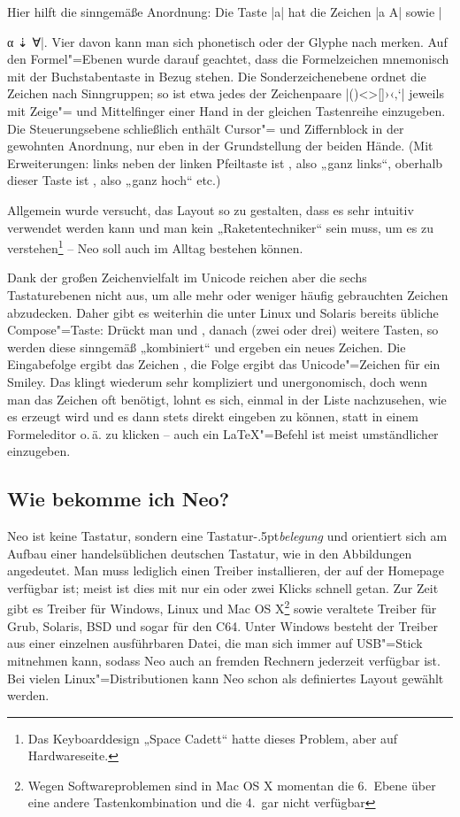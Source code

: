 \documentclass[ngerman]{dtk}
\newcommand{\taste}[1]{\makebox{\textsf{#1}}}
\begin{document}
Hier hilft die sinngemäße Anordnung: Die Taste |a| hat die Zeichen |a A| sowie |{ α ⇣ ∀|. Vier davon kann man sich phonetisch oder der Glyphe nach merken. Auf den Formel"=Ebenen wurde darauf geachtet, dass die Formelzeichen mnemonisch mit der Buchstabentaste in Bezug stehen.  Die Sonderzeichenebene ordnet die Zeichen nach Sinngruppen; so ist etwa jedes der Zeichenpaare |()<>{}[]›‹‚‘| jeweils mit Zeige"= und Mittelfinger einer Hand in der gleichen Tastenreihe einzugeben.  Die Steuerungsebene schließlich enthält Cursor"= und Ziffernblock in der gewohnten Anordnung, nur eben in der Grundstellung der beiden Hände. (Mit Erweiterungen: links neben der linken Pfeiltaste ist \taste{Pos 1}, also „ganz links“, oberhalb dieser Taste ist \taste{Bild hoch}, also „ganz hoch“ etc.)

Allgemein wurde versucht, das Layout so zu gestalten, dass es sehr intuitiv verwendet werden kann und man kein „Raketentechniker“ sein muss, um es zu verstehen\footnote{Das Keyboarddesign „Space Cadett“ hatte dieses Problem, aber auf Hardwareseite.} – Neo soll auch im Alltag bestehen können.

Dank der großen Zeichenvielfalt im Unicode reichen aber die sechs Tastaturebenen nicht aus, um alle mehr oder weniger häufig gebrauchten Zeichen abzudecken. Daher gibt es weiterhin die unter Linux und Solaris bereits übliche Compose"=Taste: Drückt man \taste{Mod 3} und \taste{Tab}, danach (zwei oder drei) weitere Tasten, so werden diese sinngemäß „kombiniert“ und ergeben ein neues Zeichen. Die Eingabefolge \taste{Compose a e} ergibt das Zeichen \taste{æ}, die Folge \taste{Compose : )} ergibt das Unicode"=Zeichen für ein Smiley. Das klingt wiederum sehr kompliziert und unergonomisch, doch wenn man das Zeichen oft benötigt, lohnt es sich, einmal in der Liste nachzusehen, wie es erzeugt wird und es dann stets direkt eingeben zu können, statt in einem Formeleditor o.\,ä. zu klicken – auch ein \LaTeX"=Befehl ist meist umständlicher einzugeben.

\subsection{Wie bekomme ich Neo?}
Neo ist keine Tastatur, sondern eine Tastatur\kern -.5pt\emph{belegung} und orientiert sich am Aufbau einer handelsüblichen deutschen Tastatur, wie in den Abbildungen angedeutet. Man muss lediglich einen Treiber installieren, der auf der Homepage verfügbar ist; meist ist dies mit nur ein oder zwei Klicks schnell getan. Zur Zeit gibt es Treiber für Windows, Linux und Mac OS X\footnote{Wegen Softwareproblemen sind in Mac OS X momentan die 6.~Ebene über eine andere Tastenkombination und die 4.~gar nicht verfügbar} sowie veraltete Treiber für Grub, Solaris, BSD und sogar für den C64. Unter Windows besteht der Treiber aus einer einzelnen ausführbaren Datei, die man sich immer auf USB"=Stick mitnehmen kann, sodass Neo auch an fremden Rechnern jederzeit verfügbar ist. Bei vielen Linux"=Distributionen kann Neo schon als definiertes Layout gewählt werden.

}
\end{document}
